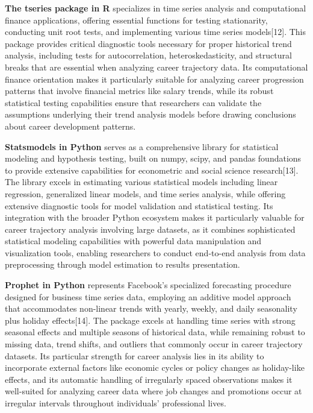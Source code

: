 \documentclass[./main.tex]{subfiles}
\begin{document}
\textbf{The tseries package in R} specializes in time series analysis
and computational finance applications, offering essential functions for
testing stationarity, conducting unit root tests, and implementing
various time series models{[}12{]}. This package provides critical
diagnostic tools necessary for proper historical trend analysis,
including tests for autocorrelation, heteroskedasticity, and structural
breaks that are essential when analyzing career trajectory data. Its
computational finance orientation makes it particularly suitable for
analyzing career progression patterns that involve financial metrics
like salary trends, while its robust statistical testing capabilities
ensure that researchers can validate the assumptions underlying their
trend analysis models before drawing conclusions about career
development patterns.

\textbf{Statsmodels in Python} serves as a comprehensive library for
statistical modeling and hypothesis testing, built on numpy, scipy, and
pandas foundations to provide extensive capabilities for econometric and
social science research{[}13{]}. The library excels in estimating
various statistical models including linear regression, generalized
linear models, and time series analysis, while offering extensive
diagnostic tools for model validation and statistical testing. Its
integration with the broader Python ecosystem makes it particularly
valuable for career trajectory analysis involving large datasets, as it
combines sophisticated statistical modeling capabilities with powerful
data manipulation and visualization tools, enabling researchers to
conduct end-to-end analysis from data preprocessing through model
estimation to results presentation.

\textbf{Prophet in Python} represents Facebook's specialized forecasting
procedure designed for business time series data, employing an additive
model approach that accommodates non-linear trends with yearly, weekly,
and daily seasonality plus holiday effects{[}14{]}. The package excels
at handling time series with strong seasonal effects and multiple
seasons of historical data, while remaining robust to missing data,
trend shifts, and outliers that commonly occur in career trajectory
datasets. Its particular strength for career analysis lies in its
ability to incorporate external factors like economic cycles or policy
changes as holiday-like effects, and its automatic handling of
irregularly spaced observations makes it well-suited for analyzing
career data where job changes and promotions occur at irregular
intervals throughout individuals' professional lives.
\end{document}
